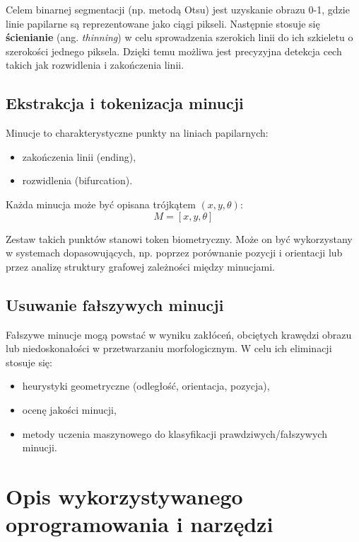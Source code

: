 Celem binarnej segmentacji (np. metodą Otsu) jest uzyskanie obrazu 0-1, gdzie linie papilarne są reprezentowane jako ciągi pikseli. Następnie stosuje się \textbf{ścienianie} (ang. \textit{thinning}) w celu sprowadzenia szerokich linii do ich szkieletu o szerokości jednego piksela. Dzięki temu możliwa jest precyzyjna detekcja cech takich jak rozwidlenia i zakończenia linii.

\subsection*{Ekstrakcja i tokenizacja minucji}

Minucje to charakterystyczne punkty na liniach papilarnych:
\begin{itemize}
	\item zakończenia linii (ending),
	\item rozwidlenia (bifurcation).
\end{itemize}

Każda minucja może być opisana trójkątem $(x, y, \theta)$:
\begin{equation}
	M = [x, y, \theta]
\end{equation}

Zestaw takich punktów stanowi token biometryczny. Może on być wykorzystany w systemach dopasowujących, np. poprzez porównanie pozycji i orientacji lub przez analizę struktury grafowej zależności między minucjami.

\subsection*{Usuwanie fałszywych minucji}

Fałszywe minucje mogą powstać w wyniku zakłóceń, obciętych krawędzi obrazu lub niedoskonałości w przetwarzaniu morfologicznym. W celu ich eliminacji stosuje się:
\begin{itemize}
	\item heurystyki geometryczne (odległość, orientacja, pozycja),
	\item ocenę jakości minucji,
	\item metody uczenia maszynowego do klasyfikacji prawdziwych/fałszywych minucji.
\end{itemize}


\section{Opis wykorzystywanego oprogramowania i narzędzi}

